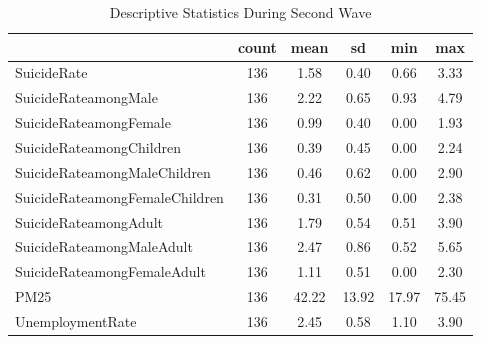 \begin{table}[htbp]\centering
\def\sym#1{\ifmmode^{#1}\else\(^{#1}\)\fi}
\caption{Descriptive Statistics During Second Wave}
\begin{tabular}{l*{1}{ccccc}}
\hline\hline
            &       count&        mean&          sd&         min&         max\\
\hline
SuicideRate &         136&        1.58&        0.40&        0.66&        3.33\\
SuicideRateamongMale&         136&        2.22&        0.65&        0.93&        4.79\\
SuicideRateamongFemale&         136&        0.99&        0.40&        0.00&        1.93\\
SuicideRateamongChildren&         136&        0.39&        0.45&        0.00&        2.24\\
SuicideRateamongMaleChildren&         136&        0.46&        0.62&        0.00&        2.90\\
SuicideRateamongFemaleChildren&         136&        0.31&        0.50&        0.00&        2.38\\
SuicideRateamongAdult&         136&        1.79&        0.54&        0.51&        3.90\\
SuicideRateamongMaleAdult&         136&        2.47&        0.86&        0.52&        5.65\\
SuicideRateamongFemaleAdult&         136&        1.11&        0.51&        0.00&        2.30\\
PM25        &         136&       42.22&       13.92&       17.97&       75.45\\
UnemploymentRate&         136&        2.45&        0.58&        1.10&        3.90\\
\hline\hline
\end{tabular}
\end{table}
